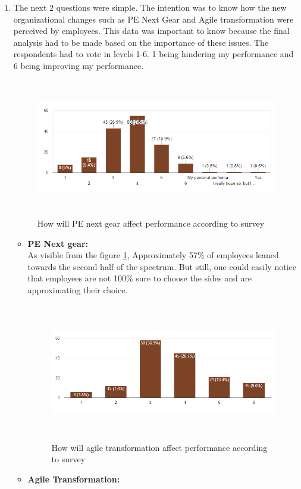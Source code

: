 \begin{enumerate}
    \item The next 2 questions were simple. The intention was to know how the new organizational changes such as PE Next Gear and Agile transformation were perceived by employees. This data was important to know because the final analysis had to be made based on the importance of these issues. The respondents had to vote in levels 1-6. 1 being hindering my performance and 6 being improving my performance.\\
    \begin{figure}[H]
    \centering
    \captionsetup{justification=centering, margin=2cm}
    \vspace{1cm}
    \includegraphics[width=14cm, height=6cm]{figure/auxiliary/fig514.PNG}
    \caption{How will PE next gear affect performance according to survey}
    \label{fig:5.14}
\end{figure}
    \begin{itemize}
        \item \textbf{PE Next gear:}\\
        As visible from the figure \ref{fig:5.14}, Approximately 57\% of employees leaned towards the second half of the spectrum. But still, one could easily notice that employees are not 100\% sure to choose the sides and are approximating their choice.\\
        \begin{figure}[H]
    \centering
    \captionsetup{justification=centering, margin=2cm}
    \vspace{1cm}
    \includegraphics[width=14cm, height=6cm]{figure/auxiliary/fig515.PNG}
    \caption{How will agile transformation affect performance according to survey}
    \label{fig:5.15}
\end{figure}
        \item \textbf{Agile Transformation:}\\
        

\end{itemize}
\end{enumerate}
